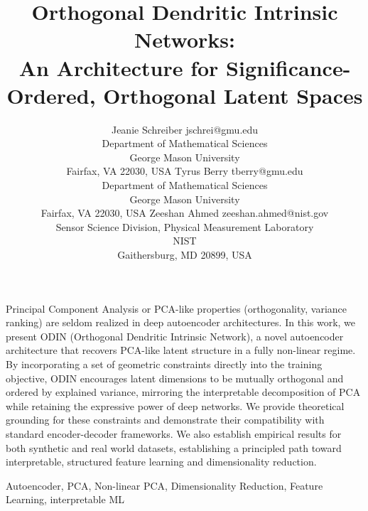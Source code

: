 \documentclass[twoside,11pt]{article}
\begin{document}
\title{Orthogonal Dendritic Intrinsic Networks: \\ An Architecture for Significance-Ordered, Orthogonal Latent Spaces}


\author{\name Jeanie Schreiber \email jschrei@gmu.edu \\
       \addr Department of Mathematical Sciences\\
       George Mason University\\
       Fairfax, VA 22030, USA
       \AND
       \name Tyrus Berry \email tberry@gmu.edu \\
       \addr Department of Mathematical Sciences\\
       George Mason University\\
       Fairfax, VA 22030, USA
       \AND
       \name Zeeshan Ahmed \email zeeshan.ahmed@nist.gov \\
       \addr Sensor Science Division, Physical Measurement Laboratory\\
       NIST\\
       Gaithersburg, MD 20899, USA}

\editor{}

\maketitle

\begin{abstract}%

\end{abstract}
Principal Component Analysis or PCA-like properties (orthogonality, variance ranking) are seldom realized in deep autoencoder architectures. In this work, we present ODIN (Orthogonal Dendritic Intrinsic Network), a novel autoencoder architecture that recovers PCA-like latent structure in a fully non-linear regime. By incorporating a set of geometric constraints directly into the training objective, ODIN encourages latent dimensions to be mutually orthogonal and ordered by explained variance, mirroring the interpretable decomposition of PCA while retaining the expressive power of deep networks. We provide theoretical grounding for these constraints and demonstrate their compatibility with standard encoder-decoder frameworks. We also establish empirical results for both synthetic and real world datasets, establishing a principled path toward interpretable, structured feature learning and dimensionality reduction.

\begin{keywords}
  Autoencoder, PCA, Non-linear PCA, Dimensionality Reduction, Feature Learning, interpretable ML
\end{keywords}
\end{document}
